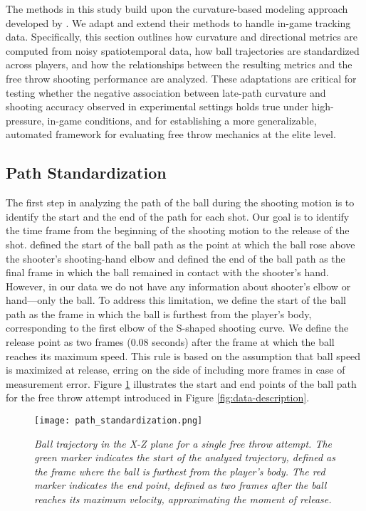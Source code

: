 \documentclass{article}
\begin{document}
    The methods in this study build upon the curvature-based modeling approach developed by \citet{slegers_role_2024}. We adapt and extend their methods to handle in-game tracking data. Specifically, this section outlines how curvature and directional metrics are computed from noisy spatiotemporal data, how ball trajectories are standardized across players, and how the relationships between the resulting metrics and the free throw shooting performance are analyzed. These adaptations are critical for testing whether the negative association between late-path curvature and shooting accuracy observed in experimental settings holds true under high-pressure, in-game conditions, and for establishing a more generalizable, automated framework for evaluating free throw mechanics at the elite level.

    \subsection{Path Standardization}

      The first step in analyzing the path of the ball during the shooting motion is to identify the start and the end of the path for each shot. Our goal is to identify the time frame from the beginning of the shooting motion to the release of the shot. \citet{slegers_role_2024} defined the start of the ball path as the point at which the ball rose above the shooter's shooting-hand elbow and defined the end of the ball path as the final frame in which the ball remained in contact with the shooter's hand. However, in our data we do not have any information about shooter's elbow or hand---only the ball. To address this limitation, we define the start of the ball path as the frame in which the ball is furthest from the player's body, corresponding to the first elbow of the S-shaped shooting curve. We define the release point as two frames (0.08 seconds) after the frame at which the ball reaches its maximum speed. This rule is based on the assumption that ball speed is maximized at release, erring on the side of including more frames in case of measurement error. Figure \ref{fig:path-standardization} illustrates the start and end points of the ball path for the free throw attempt introduced in Figure \ref{fig:data-description}.

      \begin{figure}[H]
        \centering
        \texttt{[image: path\_standardization.png]}
        \caption{\it Ball trajectory in the X-Z plane for a single free throw attempt. The green marker indicates the start of the analyzed trajectory, defined as the frame where the ball is furthest from the player’s body. The red marker indicates the end point, defined as two frames after the ball reaches its maximum velocity, approximating the moment of release.}
        \label{fig:path-standardization}
      \end{figure}
\end{document}

